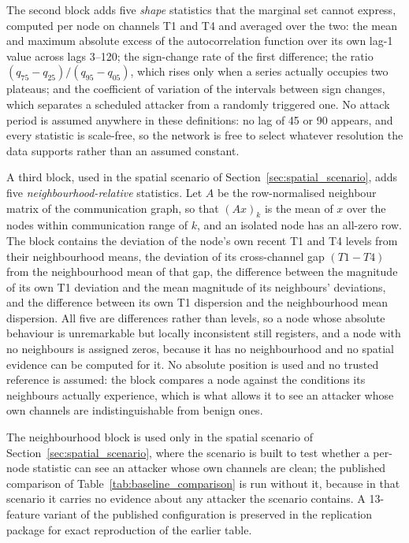 \documentclass[notspecified,article,submit,moreauthors]{Definitions/mdpi}
\begin{document}
The second block adds five \emph{shape} statistics that the marginal set cannot express, computed per node on channels T1 and T4 and averaged over the two: the mean and maximum absolute excess of the autocorrelation function over its own lag-1 value across lags 3--120; the sign-change rate of the first difference; the ratio $(q_{75}-q_{25})/(q_{95}-q_{05})$, which rises only when a series actually occupies two plateaus; and the coefficient of variation of the intervals between sign changes, which separates a scheduled attacker from a randomly triggered one. No attack period is assumed anywhere in these definitions: no lag of 45 or 90 appears, and every statistic is scale-free, so the network is free to select whatever resolution the data supports rather than an assumed constant.

A third block, used in the spatial scenario of Section~\ref{sec:spatial_scenario}, adds five \emph{neighbourhood-relative} statistics. Let $A$ be the row-normalised neighbour matrix of the communication graph, so that $(A x)_k$ is the mean of $x$ over the nodes within communication range of $k$, and an isolated node has an all-zero row. The block contains the deviation of the node's own recent T1 and T4 levels from their neighbourhood means, the deviation of its cross-channel gap $(T1-T4)$ from the neighbourhood mean of that gap, the difference between the magnitude of its own T1 deviation and the mean magnitude of its neighbours' deviations, and the difference between its own T1 dispersion and the neighbourhood mean dispersion. All five are differences rather than levels, so a node whose absolute behaviour is unremarkable but locally inconsistent still registers, and a node with no neighbours is assigned zeros, because it has no neighbourhood and no spatial evidence can be computed for it. No absolute position is used and no trusted reference is assumed: the block compares a node against the conditions its neighbours actually experience, which is what allows it to see an attacker whose own channels are indistinguishable from benign ones.

The neighbourhood block is used only in the spatial scenario of Section~\ref{sec:spatial_scenario}, where the scenario is built to test whether a per-node statistic can see an attacker whose own channels are clean; the published comparison of Table~\ref{tab:baseline_comparison} is run without it, because in that scenario it carries no evidence about any attacker the scenario contains. A 13-feature variant of the published configuration is preserved in the replication package for exact reproduction of the earlier table.
\end{document}
